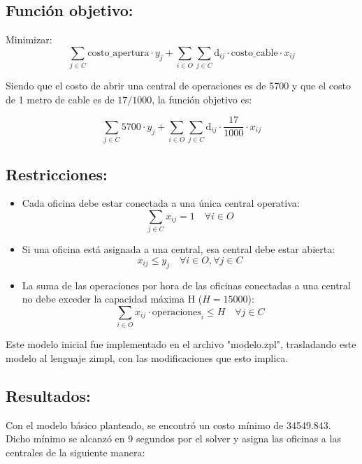 \documentclass{article}
\begin{document}
\subsection*{Función objetivo:}

Minimizar:
\[
\sum_{j \in C} \text{costo\_apertura} \cdot y_j + \sum_{i \in O} \sum_{j \in C} \text{d}_{ij} \cdot \text{costo\_cable} \cdot x_{ij}
\]

Siendo que el costo de abrir una central de operaciones es de 5700 y que el costo de 1 metro de cable es de \(17/1000\), la función objetivo es:

\[
\sum_{j \in C} 5700 \cdot y_j + \sum_{i \in O} \sum_{j \in C} \text{d}_{ij} \cdot \frac{17}{1000} \cdot x_{ij}
\]

\subsection*{Restricciones:}

\begin{itemize}
    \item Cada oficina debe estar conectada a una única central operativa:
    \[
    \sum_{j \in C} x_{ij} = 1 \quad \forall i \in O
    \]
    
    \item Si una oficina está asignada a una central, esa central debe estar abierta:
    \[
    x_{ij} \leq y_j \quad \forall i \in O, \forall j \in C
    \]

    \item La suma de las operaciones por hora de las oficinas conectadas a una central no debe exceder la capacidad máxima H (\(H = 15000\)):
    \[
    \sum_{i \in O} x_{ij} \cdot \text{operaciones}_i \leq H \quad \forall j \in C
    \]
\end{itemize}

Este modelo inicial fue implementado en el archivo "modelo.zpl", trasladando este modelo al lenguaje zimpl, con las modificaciones que esto implica.

\subsection*{Resultados:}

Con el modelo básico planteado, se encontró un costo mínimo de 34549.843. Dicho mínimo se alcanzó en 9 segundos por el solver y asigna las oficinas a las centrales de la siguiente manera:
\vspace{0.5cm}
\end{document}
